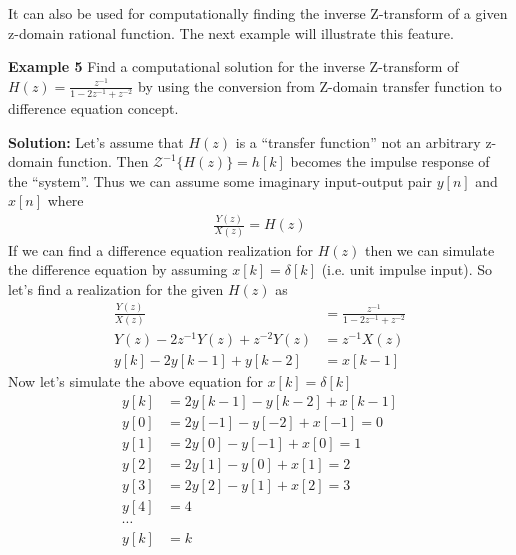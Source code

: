 \documentclass[twoside]{article}
\begin{document}
It can also be used for computationally finding the
inverse Z-transform of a given z-domain rational function. 
The next example will illustrate this feature. 

\textbf{Example 5} Find a computational solution for the inverse Z-transform of $H(z) =
\frac{z^{-1}}{1 - 2 z^{-1} + z^{-2}}$ by using the conversion from
Z-domain transfer function to difference equation concept. 

\textbf{Solution:} Let's assume that $H(z)$ is a ``transfer function''
not an arbitrary z-domain function. Then $\mathcal{Z}^{-1} \lbrace
H(z) \rbrace = h[k]$ becomes the impulse response of the ``system''. 
Thus we can assume some imaginary input-output pair $y[n]$ and
$x[n]$ where 
%
\begin{align*}
  \frac{Y(z)}{X(z)} = H(z) 
\end{align*}
%
If we can find a difference equation realization for $H(z)$
then we can simulate the difference equation by assuming
$x[k] = \delta[k]$ (i.e. unit impulse input). So let's find a
realization for the given $H(z)$ as
%
\begin{align*}
  \frac{Y(z)}{X(z)} &= \frac{z^{-1}}{1 - 2 z^{-1} + z^{-2}}
\\
Y(z) - 2 z^{-1} Y(z) + z^{-2} Y(z) &= z^{-1} X(z)
\\
y[k] - 2 y[k-1] + y[k-2] &= x[k-1]
\end{align*}
%
Now let's simulate the above equation for $x[k] = \delta[k]$
%
\begin{align*}
y[k] &= 2 y[k-1] - y[k-2]  + x[k-1]
\\
y[0] &= 2 y[-1] - y[-2]  + x[-1] = 0
\\
y[1] &= 2 y[0] - y[-1]  + x[0] = 1
\\
y[2] &= 2 y[1] - y[0]  + x[1] = 2
\\
y[3] &= 2 y[2] - y[1]  + x[2] = 3
\\
y[4] &= 4
\\
\cdots 
\\
y[k] &= k
\end{align*}
%


\end{document}
